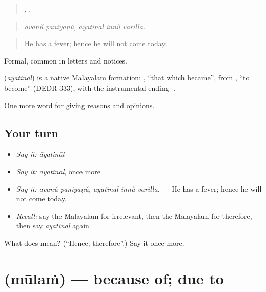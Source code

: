 \begin{quote}
 ,   .
\end{quote}

\begin{quote}
\emph{avanŭ paniyāṇŭ, āyatināl innŭ varilla.}
\end{quote}

\begin{quote}
He has a fever; hence he will not come today.
\end{quote}

Formal, common in letters and notices.

\begin{cousinweb}
\textbf{} (\emph{āyatināl}) is a native Malayalam formation: , \textquotedblleft{}that which became\textquotedblright{}, from , \textquotedblleft{}to become\textquotedblright{} (DEDR 333), with the instrumental ending -.
\end{cousinweb}

\begin{grammarlens}[title={What you've built}]
One more word for giving reasons and opinions.
\end{grammarlens}

\subsection*{Your turn}
\begin{itemize}
\raggedright
  \item \emph{Say it:} \emph{āyatināl}
  \item \emph{Say it:} \emph{āyatināl}, once more
  \item \emph{Say it:} \emph{avanŭ paniyāṇŭ, āyatināl innŭ varilla.} — He has a fever; hence he will not come today.
  \item \emph{Recall:} say the Malayalam for irrelevant, then the Malayalam for therefore, then say \emph{āyatināl} again
\end{itemize}

\begin{tcolorbox}[breakable,colback=teal!4,colframe=teal!35!black,title={Before you move on}]
What does  mean? (\textquotedblleft{}Hence; therefore\textquotedblright{}.) Say it once more.
\end{tcolorbox}
\section[\texorpdfstring{\ml{മൂലം} (mūlaṁ)}{മൂലം (mūlaṁ)}]{ (mūlaṁ) — because of; due to}

